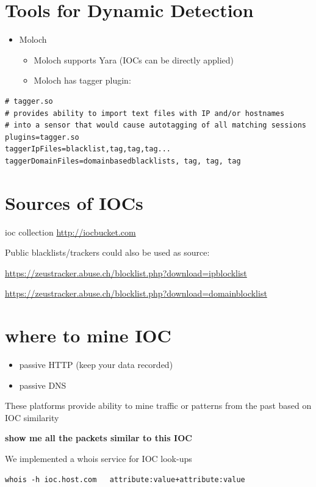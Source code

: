 \documentclass[11pt]{article}
\begin{document}
\section*{Tools for Dynamic Detection}
\label{sec-16}

\begin{itemize}
\item Moloch
\begin{itemize}
\item Moloch supports Yara (IOCs can be directly applied)
\item Moloch has tagger plugin:
\end{itemize}
\end{itemize}
\begin{verbatim}
# tagger.so
# provides ability to import text files with IP and/or hostnames 
# into a sensor that would cause autotagging of all matching sessions
plugins=tagger.so
taggerIpFiles=blacklist,tag,tag,tag...
taggerDomainFiles=domainbasedblacklists, tag, tag, tag
\end{verbatim}
\section*{Sources of IOCs}
\label{sec-17}

ioc collection
\url{http://iocbucket.com}

Public blacklists/trackers could also be used as source:

\url{https://zeustracker.abuse.ch/blocklist.php?download=ipblocklist}

\url{https://zeustracker.abuse.ch/blocklist.php?download=domainblocklist}
\section*{where to mine IOC}
\label{sec-18}

\begin{itemize}
\item passive HTTP (keep your data recorded)
\item passive DNS
\end{itemize}

These platforms provide
ability to mine traffic or patterns from the past
based on IOC similarity

\textbf{show me all the packets similar to this IOC}

We implemented a whois service for IOC look-ups
\begin{verbatim}
whois -h ioc.host.com   attribute:value+attribute:value
\end{verbatim}
\end{document}
